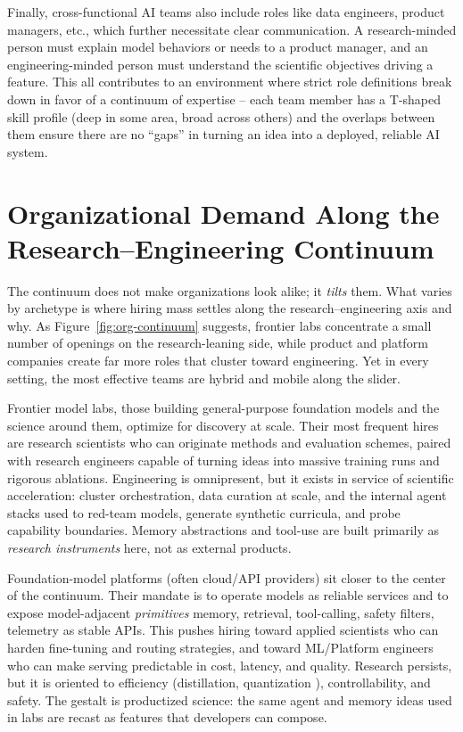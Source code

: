 \documentclass[pdflatex,sn-mathphys-num]{sn-jnl}%
\theoremstyle{thmstyleone}%
\theoremstyle{thmstyletwo}%
\theoremstyle{thmstylethree}%
\begin{document}
Finally, cross-functional AI teams also include roles like data engineers, product managers, etc., which further necessitate clear communication. A research-minded person must explain model behaviors or needs to a product manager, and an engineering-minded person must understand the scientific objectives driving a feature. This all contributes to an environment where strict role definitions break down in favor of a continuum of expertise – each team member has a T-shaped skill profile (deep in some area, broad across others) and the overlaps between them ensure there are no “gaps” in turning an idea into a deployed, reliable AI system.


\section{Organizational Demand Along the Research--Engineering Continuum}\label{sec:org-mix}

The continuum does not make organizations look alike; it \emph{tilts} them. What varies by archetype is where hiring mass settles along the research–engineering axis and why. As Figure~\ref{fig:org-continuum} suggests, frontier labs concentrate a small number of openings on the research-leaning side, while product and platform companies create far more roles that cluster toward engineering. Yet in every setting, the most effective teams are hybrid and mobile along the slider.

Frontier model labs, those building general-purpose foundation models and the science around them, optimize for discovery at scale. Their most frequent hires are research scientists who can originate methods and evaluation schemes, paired with research engineers capable of turning ideas into massive training runs and rigorous ablations. Engineering is omnipresent, but it exists in service of scientific acceleration: cluster orchestration, data curation at scale, and the internal agent stacks used to red-team models, generate synthetic curricula, and probe capability boundaries. Memory abstractions and tool-use are built primarily as \emph{research instruments} here, not as external products.

Foundation-model platforms (often cloud/API providers) sit closer to the center of the continuum. Their mandate is to operate models as reliable services and to expose model-adjacent \emph{primitives} memory, retrieval, tool-calling, safety filters, telemetry as stable APIs. This pushes hiring toward applied scientists who can harden fine-tuning and routing strategies, and toward ML/Platform engineers who can make serving predictable in cost, latency, and quality. Research persists, but it is oriented to efficiency (distillation\citep{hinton2015distill}, quantization \citep{dettmers2022llmint8,frantar2022gptq,dettmers2023qlora}), controllability, and safety. The gestalt is productized science: the same agent \citep{yao2022react,zhou2023webarena,liu2023agentbench,wang2023voyager} and memory ideas used in labs are recast as features that developers can compose.
\end{document}
